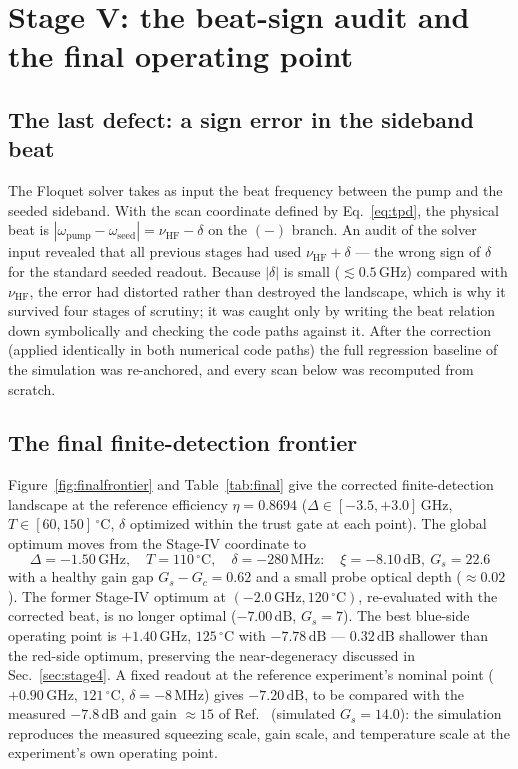 \documentclass[11pt,a4paper]{article}
\newcommand{\dB}{\,\mathrm{dB}}
\newcommand{\GHz}{\,\mathrm{GHz}}
\newcommand{\MHz}{\,\mathrm{MHz}}
\newcommand{\degC}{\,^{\circ}\mathrm{C}}
\begin{document}
\section{Stage V: the beat-sign audit and the final operating point}
\label{sec:stage5}

\subsection{The last defect: a sign error in the sideband beat}
The Floquet solver takes as input the beat frequency between the pump and
the seeded sideband. With the scan coordinate defined by
Eq.~\eqref{eq:tpd}, the physical beat is
$|\omega_{\mathrm{pump}}-\omega_{\mathrm{seed}}| = \nu_{\mathrm{HF}}-\delta$
on the $(-)$ branch. An audit of the solver input revealed that all previous
stages had used $\nu_{\mathrm{HF}}+\delta$ --- the wrong sign of $\delta$ for
the standard seeded readout. Because $|\delta|$ is small
($\lesssim 0.5\GHz$) compared with $\nu_{\mathrm{HF}}$, the error had
distorted rather than destroyed the landscape, which is why it survived
four stages of scrutiny; it was caught only by writing the beat relation
down symbolically and checking the code paths against it. After the
correction (applied identically in both numerical code paths) the full
regression baseline of the simulation was re-anchored, and every scan below
was recomputed from scratch.

\subsection{The final finite-detection frontier}
Figure~\ref{fig:finalfrontier} and Table~\ref{tab:final} give the corrected
finite-detection landscape at the reference efficiency $\eta=0.8694$
($\Delta\in[-3.5,+3.0]\GHz$, $T\in[60,150]\degC$, $\delta$ optimized within
the trust gate at each point). The global optimum moves from the Stage-IV
coordinate to
\begin{equation}
\boxed{\;\Delta=-1.50\GHz,\quad T=110\degC,\quad \delta=-280\MHz:\quad
\xi=-8.10\dB,\ G_s=22.6\; }
\end{equation}
with a healthy gain gap $G_s-G_c=0.62$ and a small probe optical depth
($\approx 0.02$). The former Stage-IV optimum at $(-2.0\GHz,120\degC)$,
re-evaluated with the corrected beat, is no longer optimal ($-7.00\dB$,
$G_s=7$). The best blue-side operating point is $+1.40\GHz$, $125\degC$ with
$-7.78\dB$ --- $0.32\dB$ shallower than the red-side optimum, preserving the
near-degeneracy discussed in Sec.~\ref{sec:stage4}. A fixed readout at the
reference experiment's nominal point ($+0.90\GHz$, $121\degC$,
$\delta=-8\MHz$) gives $-7.20\dB$, to be compared with the measured
$-7.8\dB$ and gain $\approx 15$ of Ref.~\cite{Sim2025} (simulated
$G_s=14.0$): the simulation reproduces the measured squeezing scale, gain
scale, and temperature scale at the experiment's own operating point.
\end{document}

